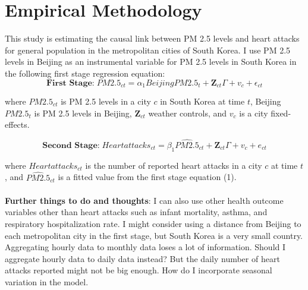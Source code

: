 \documentclass{article}
\begin{document}
\section{Empirical Methodology}
This study is estimating the causal link between PM 2.5 levels and heart attacks for general population in the metropolitan cities of South Korea. I use PM 2.5 levels in Beijing as an instrumental variable for PM 2.5 levels in South Korea in the following first stage regression equation:
\begin{equation} \label{eq:1}
    \textbf{First Stage:} \; PM2.5_{ct} = \alpha_1 BeijingPM2.5_{t} + \mathbf{Z}_{ct}\Gamma + v_c + \epsilon_{ct}
\end{equation}

where $PM2.5_{ct}$ is PM 2.5 levels in a city $c$ in South Korea at time $t$, Beijing$PM2.5_{t}$ is PM 2.5 levels in Beijing, $\mathbf{Z}_{ct}$ weather controls, and $v_c$ is a city fixed-effects.

\begin{equation} \label{eq:2}
    \textbf{Second Stage:} \; Heart attacks_{ct} = \beta_1 \hat{PM2.5}_{ct} + \mathbf{Z}_{ct}\Gamma + v_c + e_{ct}
\end{equation}

where $Heart attacks_{ct}$ is the number of reported heart attacks in a city $c$ at time $t$, and $\hat{PM2.5}_{ct}$ is a fitted value from the first stage equation (1).\\\\
\textbf{Further things to do and thoughts}: I can also use other health outcome variables other than heart attacks such as infant mortality, asthma, and respiratory hospitalization rate. I might consider using a distance from Beijing to each metropolitan city in the first stage, but South Korea is a very small country. Aggregating hourly data to monthly data loses a lot of information. Should I aggregate hourly data to daily data instead? But the daily number of heart attacks reported might not be big enough. How do I incorporate seasonal variation in the model.
\end{document}
